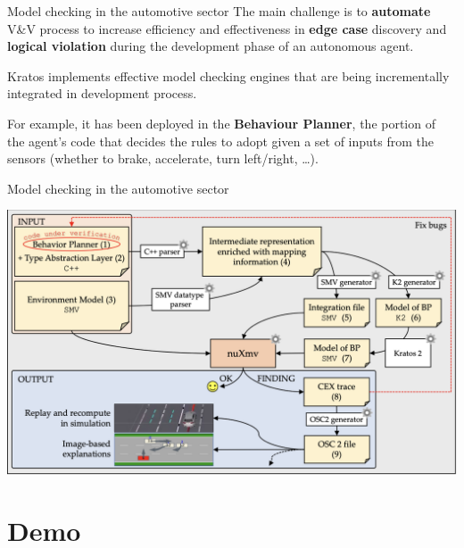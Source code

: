 \documentclass[aspectratio=1610,10.5pt]{beamer} %
\begin{document}
\begin{frame}{Model checking in the automotive sector}
    The main challenge is to \textbf{automate} V\&V process to increase efficiency and effectiveness in \textbf{edge case} discovery and \textbf{logical violation} during the development phase of an autonomous agent.

    \bigskip

    Kratos implements effective model checking engines that are being incrementally integrated in development process.

    \bigskip

    For example, it has been deployed in the \textbf{Behaviour Planner}, the portion of the agent's code that decides the rules to adopt given a set of inputs from the sensors (whether to brake, accelerate, turn left/right, \ldots).
\end{frame}

\begin{frame}{Model checking in the automotive sector}
    \begin{center}
        \includegraphics[height=%
        0.85\textheight]{../res/AutomotiveWorkflow}
    \end{center}
\end{frame}

\section{Demo}
\end{document}
